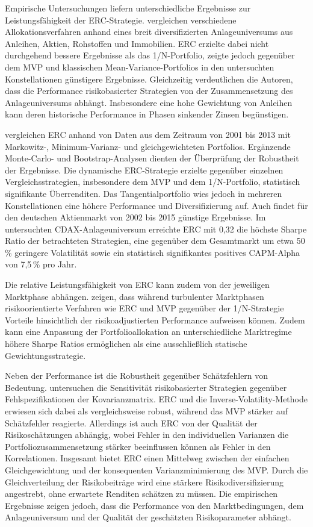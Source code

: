 \documentclass[a4paper, 12pt]{article}
\begin{document}
Empirische Untersuchungen liefern unterschiedliche Ergebnisse zur Leistungsfähigkeit der ERC-Strategie.
\textcite{chaves2011} vergleichen verschiedene Allokationsverfahren anhand eines breit diversifizierten Anlageuniversums aus Anleihen, Aktien, Rohstoffen und Immobilien.
ERC erzielte dabei nicht durchgehend bessere Ergebnisse als das 1/N-Portfolio, zeigte jedoch gegenüber dem MVP und klassischen Mean-Variance-Portfolios in den untersuchten Konstellationen günstigere Ergebnisse.
Gleichzeitig verdeutlichen die Autoren, dass die Performance risikobasierter Strategien von der Zusammensetzung des Anlageuniversums abhängt.
Insbesondere eine hohe Gewichtung von Anleihen kann deren historische Performance in Phasen sinkender Zinsen begünstigen.

\textcite{savona2019} vergleichen ERC anhand von Daten aus dem Zeitraum von 2001 bis 2013 mit Markowitz-, Minimum-Varianz- und gleichgewichteten Portfolios.
Ergänzende Monte-Carlo- und Bootstrap-Analysen dienten der Überprüfung der Robustheit der Ergebnisse.
Die dynamische ERC-Strategie erzielte gegenüber einzelnen Vergleichsstrategien, insbesondere dem MVP und dem 1/N-Portfolio, statistisch signifikante Überrenditen.
Das Tangentialportfolio wies jedoch in mehreren Konstellationen eine höhere Performance und Diversifizierung auf.
Auch \textcite{bastin2018} findet für den deutschen Aktienmarkt von 2002 bis 2015 günstige Ergebnisse.
Im untersuchten CDAX-Anlageuniversum erreichte ERC mit 0,32 die höchste Sharpe Ratio der betrachteten Strategien, eine gegenüber dem Gesamtmarkt um etwa 50\,\% geringere Volatilität sowie ein statistisch signifikantes positives CAPM-Alpha von 7,5\,\% pro Jahr.

Die relative Leistungsfähigkeit von ERC kann zudem von der jeweiligen Marktphase abhängen.
\textcite{escobar2013} zeigen, dass während turbulenter Marktphasen risikoorientierte Verfahren wie ERC und MVP gegenüber der 1/N-Strategie Vorteile hinsichtlich der risikoadjustierten Performance aufweisen können.
Zudem kann eine Anpassung der Portfolioallokation an unterschiedliche Marktregime höhere Sharpe Ratios ermöglichen als eine ausschließlich statische Gewichtungsstrategie.

Neben der Performance ist die Robustheit gegenüber Schätzfehlern von Bedeutung.
\textcite{ardia2017} untersuchen die Sensitivität risikobasierter Strategien gegenüber Fehlspezifikationen der Kovarianzmatrix.
ERC und die Inverse-Volatility-Methode erwiesen sich dabei als vergleichsweise robust, während das MVP stärker auf Schätzfehler reagierte.
Allerdings ist auch ERC von der Qualität der Risikoschätzungen abhängig, wobei Fehler in den individuellen Varianzen die Portfoliozusammensetzung stärker beeinflussen können als Fehler in den Korrelationen.
Insgesamt bietet ERC einen Mittelweg zwischen der einfachen Gleichgewichtung und der konsequenten Varianzminimierung des MVP.
Durch die Gleichverteilung der Risikobeiträge wird eine stärkere Risikodiversifizierung angestrebt, ohne erwartete Renditen schätzen zu müssen.
Die empirischen Ergebnisse zeigen jedoch, dass die Performance von den Marktbedingungen, dem Anlageuniversum und der Qualität der geschätzten Risikoparameter abhängt.
\end{document}
